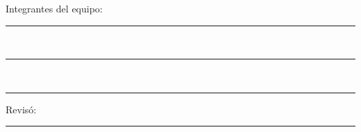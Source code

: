 \documentclass[paper=letter, fontsize=11pt]{scrartcl} %
\numberwithin{equation}{section} %
\numberwithin{figure}{section} %
\numberwithin{table}{section} %
\newcommand{\horrule}[1]{\rule{\linewidth}{#1}} %
\begin{document}
	Integrantes del equipo: \\[0.2cm]
	\horrule{0.5pt} \\[0.2cm] %
	\horrule{0.5pt} \\[0.2cm] %
	\horrule{0.5pt} %

	Revisó: \\[0.2cm]
	\horrule{0.5pt} \\%
    
\end{document}
